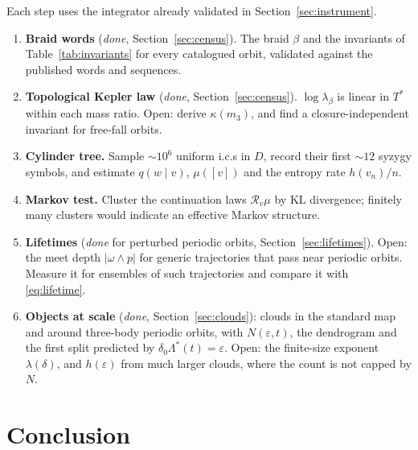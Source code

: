\documentclass[11pt]{article}
\theoremstyle{remark}
\begin{document}
Each step uses the integrator already validated in Section~\ref{sec:instrument}.

\begin{enumerate}[leftmargin=*]
\item \textbf{Braid words} (\emph{done}, Section~\ref{sec:census}). The braid $\beta$ and the invariants of
      Table~\ref{tab:invariants} for every catalogued orbit, validated against the published words and
      sequences.
\item \textbf{Topological Kepler law} (\emph{done}, Section~\ref{sec:census}). $\log\lambda_\beta$ is
      linear in $T^*$ within each mass ratio. Open: derive $\kappa(m_3)$, and find a closure-independent
      invariant for free-fall orbits.
\item \textbf{Cylinder tree.} Sample $\sim10^6$ uniform i.c.s in $D$, record their first $\sim12$ syzygy
      symbols, and estimate $q(w\mid v)$, $\mu([v])$ and the entropy rate $h(v_n)/n$.
\item \textbf{Markov test.} Cluster the continuation laws $\mathcal R_v\mu$ by KL divergence; finitely many
      clusters would indicate an effective Markov structure.
\item \textbf{Lifetimes} (\emph{done} for perturbed periodic orbits, Section~\ref{sec:lifetimes}). Open: the meet
      depth $|\omega\wedge p|$ for generic trajectories that pass near periodic orbits. Measure it for ensembles of such
      trajectories and compare it with \eqref{eq:lifetime}.
\item \textbf{Objects at scale} (\emph{done}, Section~\ref{sec:clouds}): clouds in the standard map
      \cite{Chirikov1979} and around three-body periodic orbits, with $N(\varepsilon,t)$, the dendrogram and the
      first split predicted by $\delta_0\Lambda^*(t)=\varepsilon$. Open: the finite-size exponent
      $\lambda(\delta)$, and $h(\varepsilon)$ from much larger clouds, where the count is not capped by $N$.
\end{enumerate}

\section{Conclusion}
\end{document}
